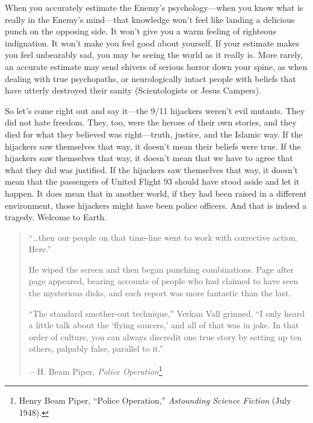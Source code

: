 {
 When you accurately estimate the Enemy's
psychology---when you know what is really in the
Enemy's mind---that knowledge won't
feel like landing a delicious punch on the opposing side. It
won't give you a warm feeling of righteous indignation.
It won't make you feel good about yourself. If your
estimate makes you feel unbearably sad, you may be seeing the world as
it really is. More rarely, an accurate estimate may send shivers of
serious horror down your spine, as when dealing with true psychopaths,
or neurologically intact people with beliefs that have utterly
destroyed their sanity (Scientologists or Jesus Campers).}

{
 So let's come right out and say it---the 9/11
hijackers weren't evil mutants. They did not hate
freedom. They, too, were the heroes of their own stories, and they died
for what they believed was right---truth, justice, and the Islamic way.
If the hijackers saw themselves that way, it doesn't
mean their beliefs were true. If the hijackers saw themselves that way,
it doesn't mean that we have to agree that what they
did was justified. If the hijackers saw themselves that way, it
doesn't mean that the passengers of United Flight 93
should have stood aside and let it happen. It does mean that in another
world, if they had been raised in a different environment, those
hijackers might have been police officers. And that is indeed a
tragedy. Welcome to Earth.}

\myendsectiontext


\begin{quotation}
{
 ``\ldots then our people on that time-line went to
work with corrective action. Here.''}

{
 He wiped the screen and then began punching combinations. Page
after page appeared, bearing accounts of people who had claimed to have
seen the mysterious disks, and each report was more fantastic than the
last.}

{
 ``The standard smother-out
technique,'' Verkan Vall grinned.
``I only heard a little talk about the
`flying saucers,' and all of that was in
joke. In that order of culture, you can always discredit one true story
by setting up ten others, palpably false, parallel to
it.''}

{\raggedleft
 {}---H. Beam Piper, \textit{Police Operation}\footnote{Henry Beam Piper, ``Police
Operation,'' \textit{Astounding Science Fiction}
(July 1948).}
\par}
\end{quotation}


